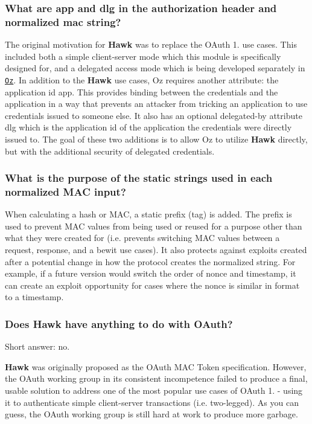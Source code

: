 \subsubsection*{What are {\ttfamily app} and {\ttfamily dlg} in the authorization header and normalized mac string?}

The original motivation for {\bfseries Hawk} was to replace the O\+Auth 1. use cases. This included both a simple client-\/server mode which this module is specifically designed for, and a delegated access mode which is being developed separately in \href{https://github.com/hueniverse/oz}{\tt Oz}. In addition to the {\bfseries Hawk} use cases, Oz requires another attribute\+: the application id {\ttfamily app}. This provides binding between the credentials and the application in a way that prevents an attacker from tricking an application to use credentials issued to someone else. It also has an optional \textquotesingle{}delegated-\/by\textquotesingle{} attribute {\ttfamily dlg} which is the application id of the application the credentials were directly issued to. The goal of these two additions is to allow Oz to utilize {\bfseries Hawk} directly, but with the additional security of delegated credentials.

\subsubsection*{What is the purpose of the static strings used in each normalized M\+AC input?}

When calculating a hash or M\+AC, a static prefix (tag) is added. The prefix is used to prevent M\+AC values from being used or reused for a purpose other than what they were created for (i.\+e. prevents switching M\+AC values between a request, response, and a bewit use cases). It also protects against exploits created after a potential change in how the protocol creates the normalized string. For example, if a future version would switch the order of nonce and timestamp, it can create an exploit opportunity for cases where the nonce is similar in format to a timestamp.

\subsubsection*{Does {\bfseries Hawk} have anything to do with O\+Auth?}

Short answer\+: no.

{\bfseries Hawk} was originally proposed as the O\+Auth M\+AC Token specification. However, the O\+Auth working group in its consistent incompetence failed to produce a final, usable solution to address one of the most popular use cases of O\+Auth 1. -\/ using it to authenticate simple client-\/server transactions (i.\+e. two-\/legged). As you can guess, the O\+Auth working group is still hard at work to produce more garbage.

